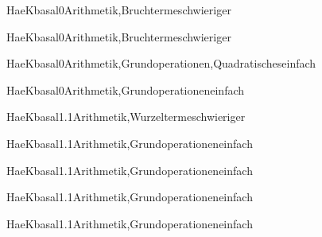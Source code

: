 \documentclass[12pt]{article}
\begin{document}
\begin{Add}{HaeK}{basal0}{Arithmetik,Bruchterme}{schwieriger}
\end{Add}

\begin{Add}{HaeK}{basal0}{Arithmetik,Bruchterme}{schwieriger}
\end{Add}

\begin{Add}{HaeK}{basal0}{Arithmetik,Grundoperationen,Quadratisches}{einfach}
\end{Add}

\begin{Add}{HaeK}{basal0}{Arithmetik,Grundoperationen}{einfach}
\end{Add}

\begin{Add}{HaeK}{basal1.1}{Arithmetik,Wurzelterme}{schwieriger}
\end{Add}

\begin{Add}{HaeK}{basal1.1}{Arithmetik,Grundoperationen}{einfach}
\end{Add}

\begin{Add}{HaeK}{basal1.1}{Arithmetik,Grundoperationen}{einfach}
\end{Add}

\begin{Add}{HaeK}{basal1.1}{Arithmetik,Grundoperationen}{einfach}
\end{Add}

\begin{Add}{HaeK}{basal1.1}{Arithmetik,Grundoperationen}{einfach}
\end{Add}
\end{document}
